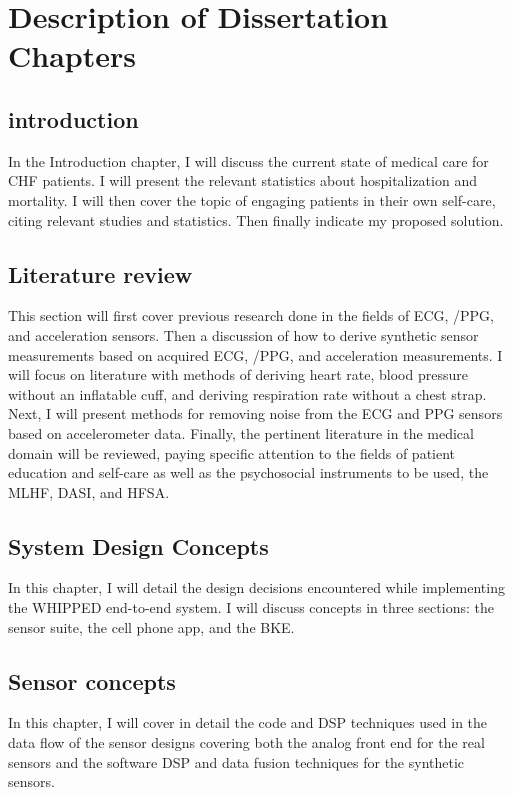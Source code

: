 \section{Description of Dissertation Chapters}
\iffalse
\subsection{ introduction}
\label{subsec:Chapter1Introduction}
In the Introduction chapter, I will discuss the current state of medical care for CHF patients. I will present the relevant statistics about hospitalization and mortality. I will then cover the topic of engaging patients in their own self-care, citing relevant studies and statistics. Then finally indicate my proposed solution.
\subsection{ Literature review}
\label{subsec:Chapter2LitReview}
This section will first cover previous research done in the fields of ECG,  /PPG, and acceleration sensors. Then a discussion of how to derive synthetic sensor measurements based on acquired ECG,  /PPG, and acceleration measurements. I will focus on literature with methods of deriving heart rate, blood pressure without an inflatable cuff, and deriving respiration rate without a chest strap. Next, I will present methods for removing noise from the ECG and PPG sensors based on accelerometer data. Finally, the pertinent literature in the medical domain will be reviewed, paying specific attention to the fields of patient education and self-care as well as the psychosocial instruments to be used, the MLHF, DASI, and HFSA.

\subsection{ System Design Concepts}
\label{subsec:Chapter3SystemDesignConcepts}
In this chapter, I will detail the design decisions encountered while implementing the WHIPPED end-to-end system. I will discuss concepts in three sections: the sensor suite, the cell phone app, and the BKE.

\subsection{ Sensor concepts}
\label{subsec:Chapter4SensorConcepts}
In this chapter, I will cover in detail the code and DSP techniques used in the data flow of the sensor designs covering both the analog front end for the real sensors and the software DSP and data fusion techniques for the synthetic sensors.

